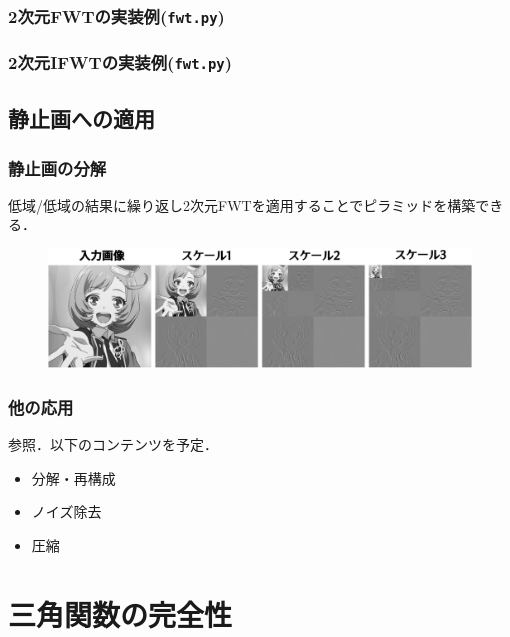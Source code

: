 \documentclass[dvipdfmx,graphicx,14pt]{beamer}
\newcommand{\myhref}[3][blue]{\href{#2}{\color{#1}{#3}}}%
\begin{document}
\begin{frame}[c]
    \frametitle{2次元FWTの実装例(\texttt{fwt.py})}
    
    
\end{frame}

\begin{frame}[c]
    \frametitle{2次元IFWTの実装例(\texttt{fwt.py})}
    
\end{frame}

\subsection{静止画への適用}

\begin{frame}[c]
    \frametitle{静止画の分解}
    低域/低域の結果に繰り返し2次元FWTを適用することでピラミッドを構築できる．
    \begin{figure}
        \includegraphics[width=115mm]{./figs/naru_mra_decomp.png}
    \end{figure}
\end{frame}

\begin{frame}[c]
    \frametitle{他の応用}
    \myhref{https://github.com/aikiriao/introduction_to_wavelet/blob/main/implementation/fwt_demos.ipynb}{NoteBook}参照．以下のコンテンツを予定．
    \begin{itemize}
        \item 分解・再構成
        \item ノイズ除去
        \item 圧縮
    \end{itemize}
\end{frame}

\appendix
\setcounter{section}{0}
\renewcommand\insertsectionnumber{\Alph{section}}

\section{三角関数の完全性}
\end{document}
